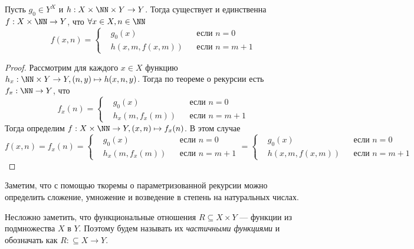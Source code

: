 \documentclass[12pt,a4paper]{article}
\begin{document}
    \begin{theorem}
        Пусть $g_0 \in Y^X$ и $h: X \times \NN \times Y \to Y$. Тогда существует и единственна $f: X \times \NN \to Y$, что $\forall x \in X, n \in \NN$
        \[f(x, n) = \left\{\begin{aligned}
            &g_0(x)&&\text{если }n=0\\
            &h(x, m ,f(x, m))&&\text{если }n=m+1
        \end{aligned}\right.\]
    \end{theorem}

    \begin{proof}
        Рассмотрим для каждого $x \in X$ функцию $h_x: \NN \times Y \to Y, (n, y) \mapsto h(x, n, y)$. Тогда по теореме о рекурсии есть $f_x: \NN \to Y$, что
        \[f_x(n) = \left\{\begin{aligned}
            &g_0(x)&&\text{если $n=0$}\\
            &h_x(m, f_x(m))&&\text{если $n=m+1$}
        \end{aligned}\right.\]
        Тогда определим $f: X \times \NN \to Y, (x, n) \mapsto f_x(n)$. В этом случае
        \[f(x, n) = f_x(n) = \left\{\begin{aligned}
            &g_0(x)&&\text{если $n=0$}\\
            &h_x(m, f_x(m))&&\text{если $n=m+1$}
        \end{aligned}\right.=\left\{\begin{aligned}
            &g_0(x)&&\text{если $n=0$}\\
            &h(x, m, f(x, m))&&\text{если $n=m+1$}
        \end{aligned}\right.\]
    \end{proof}


    \begin{remark}
        Заметим, что с помощью ткоремы о параметризованной рекурсии можно определить сложение, умножение и возведение в степень на натуральных числах.
    \end{remark}

    \begin{definition}
        Несложно заметить, что функциональные отношения $R \subseteq X \times Y$ --- функции из подмножества $X$ в $Y$. Поэтому будем называть их \emph{частичными функциями} и обозначать как $R: \subseteq X \to Y$.
    \end{definition}
\end{document}
